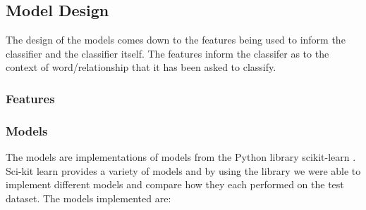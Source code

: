 \documentclass[11pt,oneside]{book}
\begin{document}
\subsection{Model Design}
The design of the models comes down to the features being used to inform the classifier and the classifier itself. The features inform the classifer as to the context of word/relationship that it has been asked to classify.

\subsubsection{Features}

\subsubsection{Models}

The models are implementations of models from the {P}ython library scikit-learn \citep{scikit-learn}. Sci-kit learn provides a variety of models and by using the library we were able to implement different models and compare how they each performed on the test dataset. The models implemented are:
\end{document}
